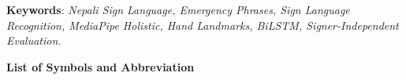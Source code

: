 \vspace{1em}
\noindent
\textbf{Keywords}: \textit{Nepali Sign Language, Emergency Phrases, Sign Language Recognition, MediaPipe Holistic, Hand Landmarks, BiLSTM, Signer-Independent Evaluation.}
\newpage

\tableofcontents
\newpage

\listoftables
\newpage

\listoffigures
\newpage

\begin{center}
    {\Large\bfseries List of Symbols and Abbreviation}
\end{center}
\vspace{0.5em}
